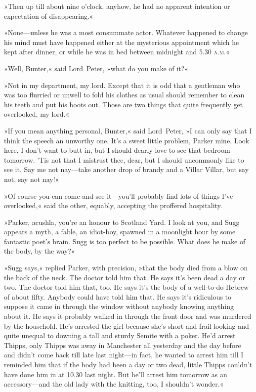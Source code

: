 »Then up till about nine o'clock, anyhow, he had no apparent intention or expectation of disappearing.«

»None—unless he was a most consummate actor. Whatever happened to change his mind must have happened either at the mysterious appointment which he kept after dinner, or while he was in bed between midnight and 5.30 \textsc{a.m.}«

»Well, Bunter,« said Lord~Peter, »what do you make of it?«

»Not in my department, my lord. Except that it is odd that a gentleman who was too flurried or unwell to fold his clothes as usual should remember to clean his teeth and put his boots out. Those are two things that quite frequently get overlooked, my lord.«

»If you mean anything personal, Bunter,« said Lord~Peter, »I can only say that I think the speech an unworthy one. It's a sweet little problem, Parker mine. Look here, I don't want to butt in, but I should dearly love to see that bedroom tomorrow. 'Tis not that I mistrust thee, dear, but I should uncommonly like to see it. Say me not nay—take another drop of brandy and a Villar Villar, but say not, say not nay!«

»Of course you can come and see it—you'll probably find lots of things I've overlooked,« said the other, equably, accepting the proffered hospitality.

»Parker, acushla, you're an honour to Scotland Yard. I look at you, and Sugg appears a myth, a fable, an idiot-boy, spawned in a moonlight hour by some fantastic poet's brain. Sugg is too perfect to be possible. What does he make of the body, by the way?«

»Sugg says,« replied Parker, with precision, »that the body died from a blow on the back of the neck. The doctor told him that. He says it's been dead a day or two. The doctor told him that, too. He says it's the body of a well-to-do Hebrew of about fifty. Anybody could have told him that. He says it's ridiculous to suppose it came in through the window without anybody knowing anything about it. He says it probably walked in through the front door and was murdered by the household. He's arrested the girl because she's short and frail-looking and quite unequal to downing a tall and sturdy Semite with a poker. He'd arrest Thipps, only Thipps was away in Manchester all yesterday and the day before and didn't come back till late last night—in fact, he wanted to arrest him till I reminded him that if the body had been a day or two dead, little Thipps couldn't have done him in at 10.30 last night. But he'll arrest him tomorrow as an accessory—and the old lady with the knitting, too, I shouldn't wonder.«

